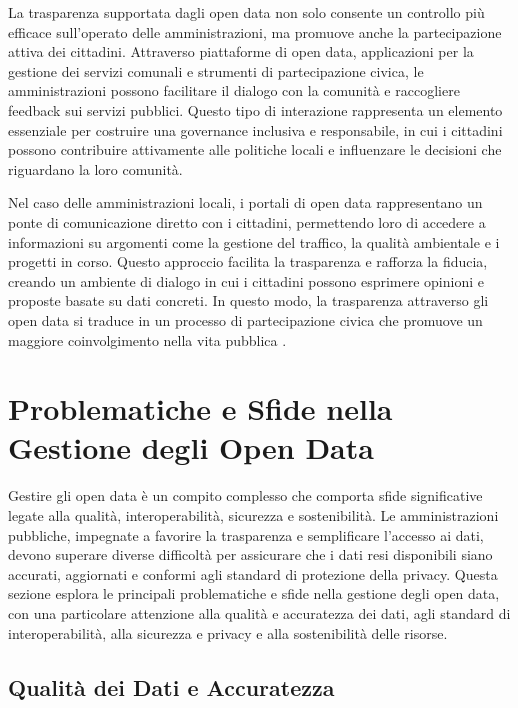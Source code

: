 La trasparenza supportata dagli open data non solo consente un controllo più efficace sull'operato delle amministrazioni, ma promuove anche la partecipazione attiva dei cittadini. Attraverso piattaforme di open data, applicazioni per la gestione dei servizi comunali e strumenti di partecipazione civica, le amministrazioni possono facilitare il dialogo con la comunità e raccogliere feedback sui servizi pubblici. Questo tipo di interazione rappresenta un elemento essenziale per costruire una governance inclusiva e responsabile, in cui i cittadini possono contribuire attivamente alle politiche locali e influenzare le decisioni che riguardano la loro comunità.

Nel caso delle amministrazioni locali, i portali di open data rappresentano un ponte di comunicazione diretto con i cittadini, permettendo loro di accedere a informazioni su argomenti come la gestione del traffico, la qualità ambientale e i progetti in corso. Questo approccio facilita la trasparenza e rafforza la fiducia, creando un ambiente di dialogo in cui i cittadini possono esprimere opinioni e proposte basate su dati concreti. In questo modo, la trasparenza attraverso gli open data si traduce in un processo di partecipazione civica che promuove un maggiore coinvolgimento nella vita pubblica \cite{Janssen2012}.


\section{Problematiche e Sfide nella Gestione degli Open Data}

Gestire gli open data è un compito complesso che comporta sfide significative legate alla qualità, interoperabilità, sicurezza e sostenibilità. Le amministrazioni pubbliche, impegnate a favorire la trasparenza e semplificare l’accesso ai dati, devono superare diverse difficoltà per assicurare che i dati resi disponibili siano accurati, aggiornati e conformi agli standard di protezione della privacy. Questa sezione esplora le principali problematiche e sfide nella gestione degli open data, con una particolare attenzione alla qualità e accuratezza dei dati, agli standard di interoperabilità, alla sicurezza e privacy e alla sostenibilità delle risorse.



\subsection{Qualità dei Dati e Accuratezza}

